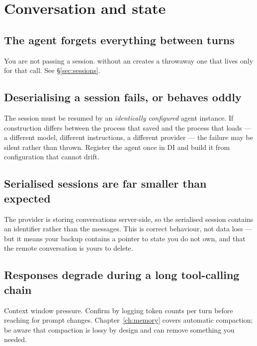 \section{Conversation and state}

\subsection{The agent forgets everything between turns}

You are not passing a session.  without an 
creates a throwaway one that lives only for that call. See
\S\ref{sec:sessions}.

\subsection{Deserialising a session fails, or behaves oddly}

The session must be resumed by an \emph{identically configured} agent instance.
If construction differs between the process that saved and the process that
loads --- a different model, different instructions, a different provider --- the
failure may be silent rather than thrown. Register the agent once in DI and build
it from configuration that cannot drift.

\subsection{Serialised sessions are far smaller than expected}

The provider is storing conversations server-side, so the serialised session
contains an identifier rather than the messages. This is correct behaviour, not
data loss --- but it means your backup contains a pointer to state you do not
own, and that the remote conversation is yours to delete.

\subsection{Responses degrade during a long tool-calling chain}

Context window pressure. Confirm by logging token counts per turn before
reaching for prompt changes. Chapter~\ref{ch:memory} covers automatic compaction;
be aware that compaction is lossy by design and can remove something you needed.

